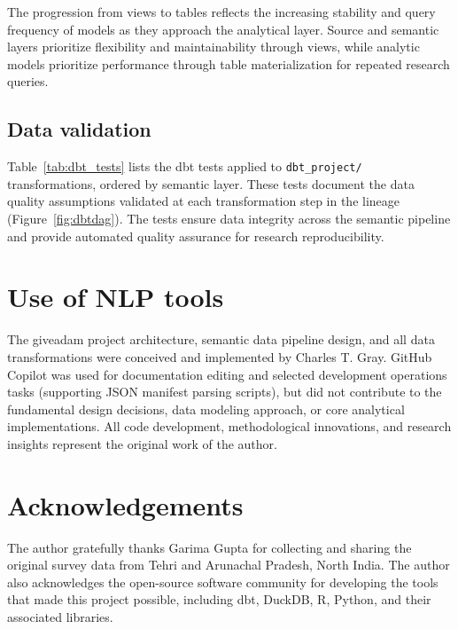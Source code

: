 \documentclass{article}
\begin{document}
The progression from views to tables reflects the increasing stability and query frequency of models as they approach the analytical layer. Source and semantic layers prioritize flexibility and maintainability through views, while analytic models prioritize performance through table materialization for repeated research queries.

\subsection{Data validation}

Table~\ref{tab:dbt_tests} lists the dbt tests applied to \texttt{dbt\_project/} transformations, ordered by semantic layer. These tests document the data quality assumptions validated at each transformation step in the lineage (Figure~\ref{fig:dbtdag}). The tests ensure data integrity across the semantic pipeline and provide automated quality assurance for research reproducibility.



\section{Use of NLP tools}

The giveadam project architecture, semantic data pipeline design, and all data transformations were conceived and implemented by Charles T. Gray. GitHub Copilot \cite{copilot} was used for documentation editing and selected development operations tasks (supporting JSON manifest parsing scripts), but did not contribute to the fundamental design decisions, data modeling approach, or core analytical implementations. All code development, methodological innovations, and research insights represent the original work of the author.

\section{Acknowledgements}

The author gratefully thanks Garima Gupta for collecting and sharing the original survey data from Tehri and Arunachal Pradesh, North India. The author also acknowledges the open-source software community for developing the tools that made this project possible, including dbt, DuckDB, R, Python, and their associated libraries.



\end{document}
